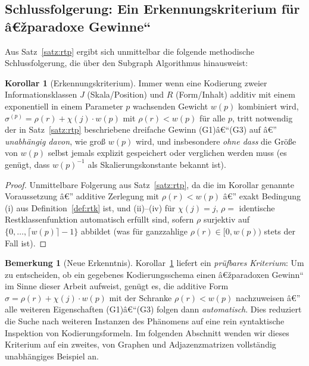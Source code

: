 ﻿\documentclass[a4paper,12pt]{article}
\theoremstyle{definition}
\newtheorem{bemerkung}{Bemerkung}
\newtheorem{korollar}{Korollar}
\begin{document}
\subsection{Schlussfolgerung: Ein Erkennungskriterium für â€žparadoxe Gewinne``}

Aus Satz~\ref{satz:rtp} ergibt sich unmittelbar die folgende methodische
Schlussfolgerung, die über den Subgraph Algorithmus hinausweist:

\begin{korollar}[Erkennungskriterium]
\label{kor:erkennung}
	Immer wenn eine Kodierung zweier Informationsklassen $J$ (Skala/Position)
	und $R$ (Form/Inhalt) additiv mit einem exponentiell in einem Parameter
	$p$ wachsenden Gewicht $w(p)$ kombiniert wird,
	$\sigma^{(p)} = \rho(r) + \chi(j)\cdot w(p)$ mit $\rho(r) < w(p)$ für alle
	$p$, tritt notwendig der in Satz~\ref{satz:rtp} beschriebene
	dreifache Gewinn (G1)â€“(G3) auf â€” \emph{unabhängig davon}, wie groß
	$w(p)$ wird, und insbesondere \emph{ohne dass} die Größe von $w(p)$
	selbst jemals explizit gespeichert oder verglichen werden muss
	(es genügt, dass $w(p)^{-1}$ als Skalierungskonstante bekannt ist).
\end{korollar}

\begin{proof}
	Unmittelbare Folgerung aus Satz~\ref{satz:rtp}, da die im Korollar
	genannte Voraussetzung â€” additive Zerlegung mit $\rho(r)<w(p)$ â€” exakt
	Bedingung (i) aus Definition~\ref{def:rtk} ist, und (ii)--(iv) für
	$\chi(j)=j$, $\rho=$ identische Restklassenfunktion automatisch erfüllt
	sind, sofern $\rho$ surjektiv auf $\{0,\ldots,\lceil w(p)\rceil-1\}$
	abbildet (was für ganzzahlige $\rho(r)\in[0,w(p))$ stets der Fall ist).
\end{proof}

\begin{bemerkung}[Neue Erkenntnis]
	Korollar~\ref{kor:erkennung} liefert ein \emph{prüfbares Kriterium}: Um
	zu entscheiden, ob ein gegebenes Kodierungsschema einen â€žparadoxen
	Gewinn`` im Sinne dieser Arbeit aufweist, genügt es, die additive Form
	$\sigma = \rho(r)+\chi(j)\cdot w(p)$ mit der Schranke $\rho(r)<w(p)$
	nachzuweisen â€” alle weiteren Eigenschaften (G1)â€“(G3) folgen dann
	\emph{automatisch}. Dies reduziert die Suche nach weiteren Instanzen des
	Phänomens auf eine rein syntaktische Inspektion von Kodierungsformeln.
	Im folgenden Abschnitt wenden wir dieses Kriterium auf ein zweites,
	von Graphen und Adjazenzmatrizen vollständig unabhängiges Beispiel an.
\end{bemerkung}
\end{document}
